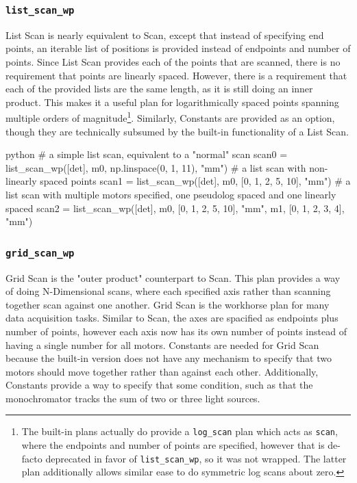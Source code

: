 \subsubsection{\texttt{list\_scan\_wp}}

List Scan is nearly equivalent to Scan, except that instead of specifying end points, an iterable list of positions is provided instead of endpoints and number of points.
Since List Scan provides each of the points that are scanned, there is no requirement that points are linearly spaced.
However, there is a requirement that each of the provided lists are the same length, as it is still doing an inner product.
This makes it a useful plan for logarithmically spaced points spanning multiple orders of magnitude\footnote{The built-in plans actually do provide a \texttt{log\_scan} plan which acts as \texttt{scan}, where the endpoints and number of points are specified, however that is de-facto deprecated in favor of \texttt{list\_scan\_wp}, so it was not wrapped. The latter plan additionally allows similar ease to do symmetric log scans about zero.}.
Similarly, Constants are provided as an option, though they are technically subsumed by the built-in functionality of a List Scan.

\begin{codefragment}{python}
# a simple list scan, equivalent to a "normal" scan
scan0 = list_scan_wp([det], m0, np.linspace(0, 1, 11), "mm")
# a list scan with non-linearly spaced points
scan1 = list_scan_wp([det], m0, [0, 1,  2, 5, 10], "mm")
# a list scan with multiple motors specified, one pseudolog spaced and one linearly spaced
scan2 = list_scan_wp([det], m0, [0, 1, 2, 5, 10], "mm", m1, [0, 1, 2, 3, 4], "mm")
\end{codefragment}

\subsubsection{\texttt{grid\_scan\_wp}}

Grid Scan is the "outer product" counterpart to Scan.
This plan provides a way of doing N-Dimensional scans, where each specified axis rather than scanning together scan against one another.
Grid Scan is the workhorse plan for many data acquisition tasks.
Similar to Scan, the axes are spacified as endpoints plus number of points, however each axis now has its own number of points instead of having a single number for all motors.
Constants are needed for Grid Scan because the built-in version does not have any mechanism to specify that two motors should move together rather than against each other.
Additionally, Constants provide a way to specify that some condition, such as that the monochromator tracks the sum of two or three light sources.

